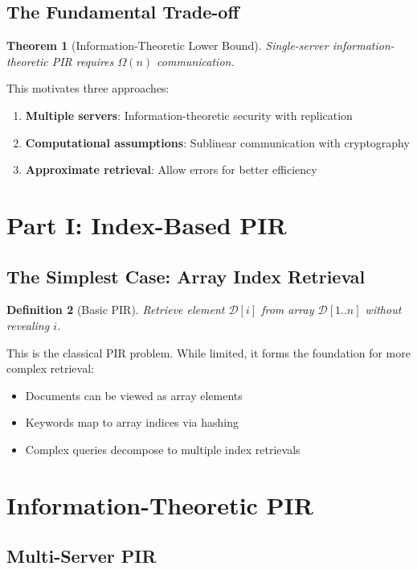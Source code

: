 \documentclass[11pt,final,hidelinks]{article}
\newcommand{\DB}{\mathcal{D}}
\newtheorem{theorem}{Theorem}[section]
\newtheorem{definition}[theorem]{Definition}
\begin{document}
\subsection{The Fundamental Trade-off}

\begin{theorem}[Information-Theoretic Lower Bound]
Single-server information-theoretic PIR requires $\Omega(n)$ communication.
\end{theorem}

This motivates three approaches:
\begin{enumerate}
    \item \textbf{Multiple servers}: Information-theoretic security with replication
    \item \textbf{Computational assumptions}: Sublinear communication with cryptography
    \item \textbf{Approximate retrieval}: Allow errors for better efficiency
\end{enumerate}

\section{Part I: Index-Based PIR}

\subsection{The Simplest Case: Array Index Retrieval}

\begin{definition}[Basic PIR]
Retrieve element $\DB[i]$ from array $\DB[1..n]$ without revealing $i$.
\end{definition}

This is the classical PIR problem. While limited, it forms the foundation for more complex retrieval:
\begin{itemize}
    \item Documents can be viewed as array elements
    \item Keywords map to array indices via hashing
    \item Complex queries decompose to multiple index retrievals
\end{itemize}

\section{Information-Theoretic PIR}

\subsection{Multi-Server PIR}
\end{document}
